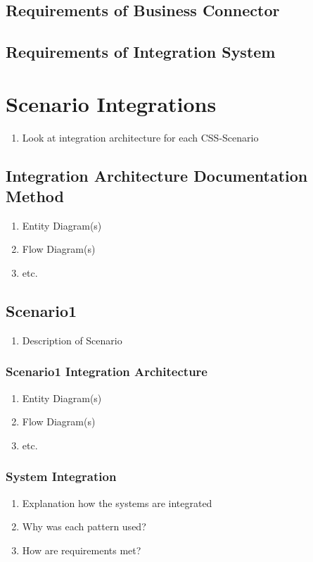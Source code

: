 \documentclass[
     12pt,         %
     a4paper,      %
     BCOR10mm,     %
     DIV14,        %
     ]{scrreprt}
\begin{document}
\subsection{Requirements of Business Connector}

\subsection{Requirements of Integration System}

\section{Scenario Integrations}
\begin{enumerate}
     \item Look at integration architecture for each CSS-Scenario
\end{enumerate}

\subsection{Integration Architecture Documentation Method}
\begin{enumerate}
     \item Entity Diagram(s)
     \item Flow Diagram(s)
     \item etc.
\end{enumerate}

\subsection{Scenario1}
\begin{enumerate}
     \item Description of Scenario
\end{enumerate}

\subsubsection{Scenario1 Integration Architecture}
\begin{enumerate}
     \item Entity Diagram(s)
     \item Flow Diagram(s)
     \item etc.
\end{enumerate}

\subsubsection{System Integration}
\begin{enumerate}
     \item Explanation how the systems are integrated
     \item Why was each pattern used?
     \item How are requirements met?
\end{enumerate}
\end{document}
